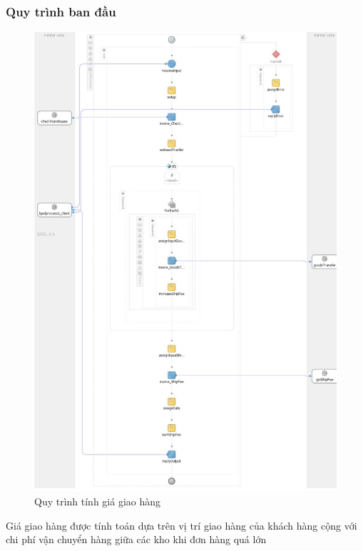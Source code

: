 \subsubsection*{Quy trình ban đầu}
\begin{figure}[!htp]
    \centering
    \includegraphics[width=14cm]{img/bpel/getShipFee.jpg}
    \newline
    \caption{Quy trình tính giá giao hàng}
\end{figure}
Giá giao hàng được tính toán dựa trên vị trí giao hàng của khách hàng cộng với chi phí vận chuyển hàng giữa các kho khi đơn hàng quá lớn

